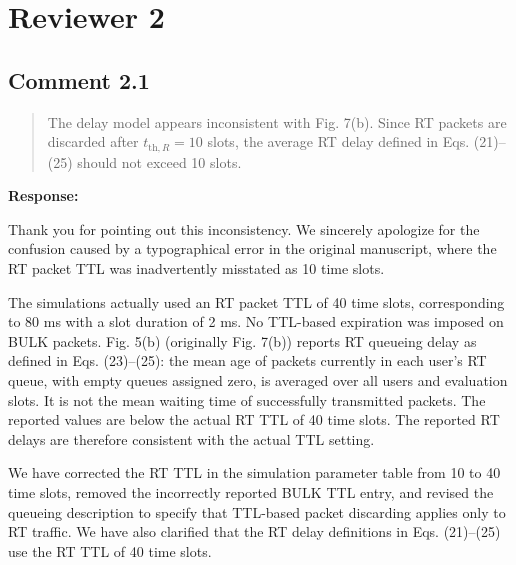 \documentclass[11pt,a4paper]{article}
\newcommand{\qrev}[1]{{\color{qinrev}#1}}
\begin{document}
\clearpage\section*{Reviewer 2}

\subsection*{Comment 2.1}

\begin{quote}\small The delay model appears inconsistent with Fig. 7(b). Since RT packets are discarded after $t_{\mathrm{th},R}=10$ slots, the average RT delay defined in Eqs. (21)--(25) should not exceed 10 slots.\end{quote}

\textbf{Response:}\par

Thank you for pointing out this inconsistency. We sincerely apologize for the confusion caused by a typographical error in the original manuscript, where the RT packet TTL was inadvertently misstated as 10 time slots.
\par

The simulations actually used an RT packet TTL of 40 time slots, corresponding to 80 ms with a slot duration of 2 ms. No TTL-based expiration was imposed on BULK packets. \qrev{Fig. 5(b) (originally Fig. 7(b))} reports RT queueing delay as defined in Eqs. (23)--(25): the mean age of packets currently in each user's RT queue, with empty queues assigned zero, is averaged over all users and evaluation slots. It is not the mean waiting time of successfully transmitted packets. The reported values are below the actual RT TTL of 40 time slots. The reported RT delays are therefore consistent with the actual TTL setting.
\par

We have corrected the RT TTL in the simulation parameter table from 10 to 40 time slots, removed the incorrectly reported BULK TTL entry, and revised the queueing description to specify that TTL-based packet discarding applies only to RT traffic. We have also clarified that the RT delay definitions in Eqs. (21)--(25) use the RT TTL of 40 time slots.
\par

\end{document}
